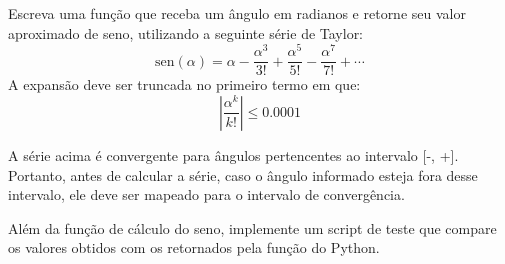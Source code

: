 Escreva uma função  que receba um ângulo em radianos e retorne seu valor aproximado de seno, utilizando a seguinte série de Taylor:
\begin{equation}\label{seno}
\text{sen}(\alpha) = \alpha-\dfrac{\alpha^3}{3!}+\dfrac{\alpha^5}{5!}-\dfrac{\alpha^7}{7!}+\cdots
\end{equation}
A expansão deve ser truncada no primeiro termo em que:
\begin{equation}
    \left| \dfrac{\alpha^k}{k!} \right| \leq 0.0001
\end{equation}

A série acima é convergente para ângulos pertencentes ao intervalo [-\pi, +\pi].
Portanto, antes de calcular a série, caso o ângulo informado esteja fora desse intervalo, ele deve ser mapeado para o
intervalo de convergência.


Além da função de cálculo do seno, implemente um script de teste que compare os valores obtidos com os retornados
pela função  do Python.



